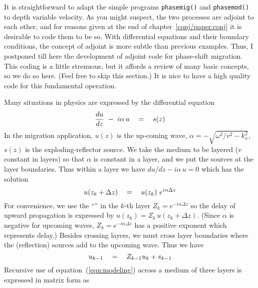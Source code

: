 It is straightforward to adapt the simple programs
\texttt{phasemig()}  and
\texttt{phasemod()} 
to depth variable velocity.
As you might suspect, the two processes are adjoint to each other,
and for reasons given at the end of chapter~\ref{conj/paper:conj}
it is desirable to code them to be so.
With differential equations and their boundary conditions,
the concept of adjoint is more subtle than previous examples.
Thus, I postponed till here the development of adjoint code
for phase-shift migration.
This coding is a little strenuous,
but it affords a review of many basic concepts,
so we do so here. (Feel free to skip this section.)
It is nice to have a high quality code for this fundamental operation.

\par
Many situations in physics are expressed by the differential equation
\begin{equation}
{du \over dz} \ - \  i \alpha \, u \quad =\quad s(z)
\end{equation}
In the migration application,
$u(z)$ is the up-coming wave,
$\alpha=-\sqrt{\omega^2 /v^2 - k_x^2}$,
$s(z)$ is the exploding-reflector source.
We take the medium to be layered
($v$ constant in layers)
so that $\alpha$ is constant in a layer,
and we put the sources at the layer boundaries.
Thus within a layer we have $du / dz - i \alpha \, u = 0$
which has the solution 
\begin{equation}
u(z_k+\Delta z ) \quad =\quad u(z_k)\  e^{i \alpha \Delta z}
\end{equation}
For convenience, we use the ``''
in the $k$-th layer
$Z_k= e^{-i \alpha \Delta z}$
so the delay of upward propagation is expressed by
$ u(z_k) = Z_k \, u(z_k+\Delta z )$.
(Since $\alpha$ is negative for upcoming waves,
$Z_k= e^{-i \alpha \Delta z}$
has a positive exponent which represents delay.)
Besides crossing layers, we must cross layer boundaries
where the (reflection) sources add to the upcoming wave.
Thus we have
\begin{equation}
u_{k-1} \quad =\quad Z_{k-1} u_k + s_{k-1}
\label{eqn:modeling}
\end{equation}
Recursive use of equation~(\ref{eqn:modeling}) across a medium
of three layers is expressed in matrix form as
